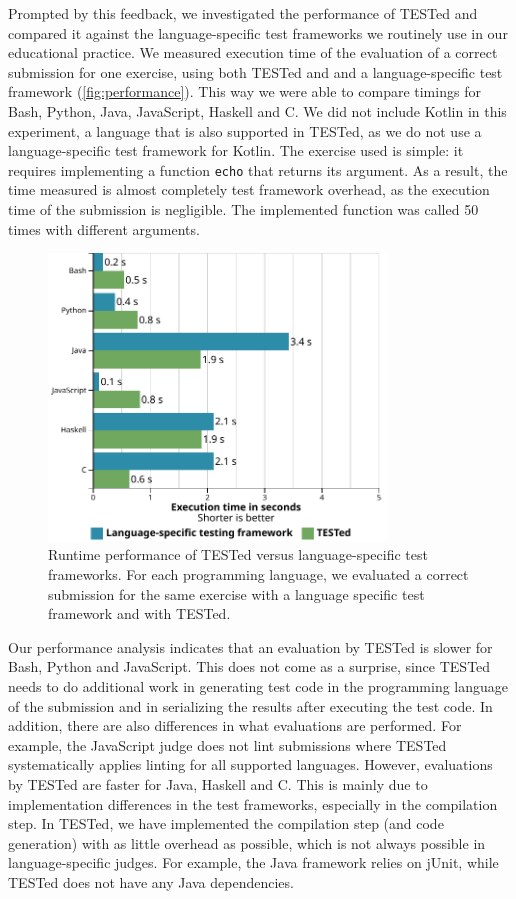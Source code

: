 \documentclass[../main]{subfiles}
\begin{document}
Prompted by this feedback, we investigated the performance of TESTed and compared it against the language-specific test frameworks we routinely use in our educational practice.
We measured execution time of the evaluation of a correct submission for one exercise, using both TESTed and and a language-specific test framework (\vref{fig:performance}).
This way we were able to compare timings for Bash, Python, Java, JavaScript, Haskell and C\@.
We did not include Kotlin in this experiment, a language that is also supported in TESTed, as we do not use a language-specific test framework for Kotlin.
The exercise used is simple: it requires implementing a function \texttt{echo} that returns its argument.
As a result, the time measured is almost completely test framework overhead, as the execution time of the submission is negligible.
The implemented function was called 50 times with different arguments.

\begin{figure}[t]
    \centering
    \includegraphics[width=0.8\textwidth]{performance}
    \caption{Runtime performance of TESTed versus language-specific test frameworks. For each programming language, we evaluated a correct submission for the same exercise with a language specific test framework and with TESTed.}
    \label{fig:performance}
\end{figure}

Our performance analysis indicates that an evaluation by TESTed is slower for Bash, Python and JavaScript.
This does not come as a surprise, since TESTed needs to do additional work in generating test code in the programming language of the submission and in serializing the results after executing the test code.
In addition, there are also differences in what evaluations are performed.
For example, the JavaScript judge does not lint submissions where TESTed systematically applies linting for all supported languages.
However, evaluations by TESTed are faster for Java, Haskell and C\@.
This is mainly due to implementation differences in the test frameworks, especially in the compilation step.
In TESTed, we have implemented the compilation step (and code generation) with as little overhead as possible, which is not always possible in language-specific judges.
For example, the Java framework relies on jUnit, while TESTed does not have any Java dependencies.
\end{document}
